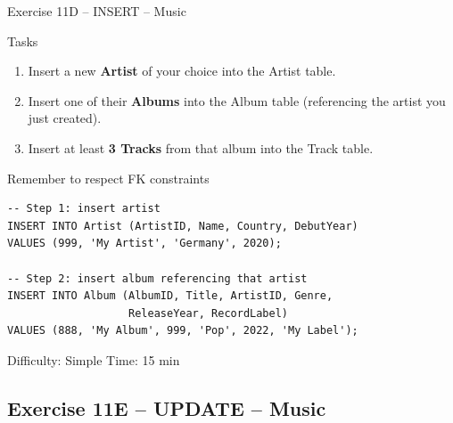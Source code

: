 \documentclass[10pt]{beamer}
\begin{document}
\begin{frame}[fragile]{Exercise 11D -- INSERT -- Music}
  \begin{block}{Tasks}
    \begin{enumerate}
      \item Insert a new \textbf{Artist} of your choice into the Artist table.
      \item Insert one of their \textbf{Albums} into the Album table (referencing the artist you just created).
      \item Insert at least \textbf{3 Tracks} from that album into the Track table.
    \end{enumerate}
  \end{block}

  \begin{block}{Remember to respect FK constraints}
\begin{lstlisting}[style=sqlstyle]
-- Step 1: insert artist
INSERT INTO Artist (ArtistID, Name, Country, DebutYear)
VALUES (999, 'My Artist', 'Germany', 2020);

-- Step 2: insert album referencing that artist
INSERT INTO Album (AlbumID, Title, ArtistID, Genre,
                   ReleaseYear, RecordLabel)
VALUES (888, 'My Album', 999, 'Pop', 2022, 'My Label');
\end{lstlisting}
  \end{block}

  \begin{alertblock}{Difficulty: Simple \quad Time: 15 min}
  \end{alertblock}
\end{frame}

\subsection{Exercise 11E -- UPDATE -- Music}
\end{document}
